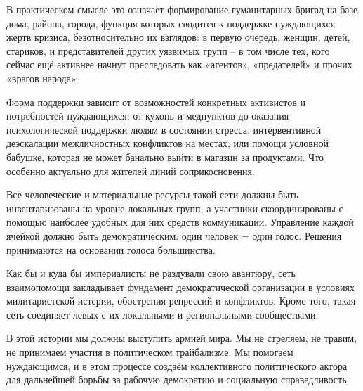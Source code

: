 В практическом смысле это означает формирование гуманитарных бригад на базе
дома, района, города, функция которых сводится к поддержке нуждающихся жертв
кризиса, безотносительно их взглядов: в первую очередь, женщин, детей,
стариков, и представителей других уязвимых групп – в том числе тех, кого сейчас
ещё активнее начнут преследовать как «агентов», «предателей» и прочих «врагов
народа».

Форма поддержки зависит от возможностей конкретных активистов и потребностей
нуждающихся: от кухонь и медпунктов до оказания психологической поддержки людям
в состоянии стресса, интервентивной деэскалации межличностных конфликтов на
местах, или помощи условной бабушке, которая не может банально выйти в магазин
за продуктами. Что особенно актуально для жителей линий соприкосновения.

Все человеческие и материальные ресурсы такой сети должны быть инвентаризованы
на уровне локальных групп, а участники скоординированы с помощью наиболее
удобных для них средств коммуникации. Управление каждой ячейкой должно быть
демократическим: один человек = один голос. Решения принимаются на основании
голоса большинства.

Как бы и куда бы империалисты не раздували свою авантюру, сеть взаимопомощи
закладывает фундамент демократической организации в условиях милитаристской
истерии, обострения репрессий и конфликтов. Кроме того, такая сеть соединяет
левых с их локальными и региональными сообществами.  

В этой истории мы должны выступить армией мира. Мы не стреляем, не травим, не
принимаем участия в политическом трайбализме. Мы помогаем нуждающимся, и в этом
процессе создаём коллективного политического актора для дальнейшей борьбы за
рабочую демократию и социальную справедливость.

